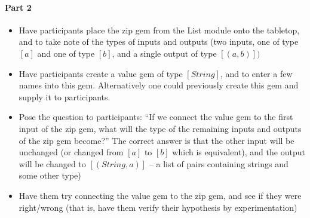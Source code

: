 {		\paragraph{Part 2}
		
		\begin{itemize}
			\item Have participants place the zip gem from the List module onto the tabletop, and to take note of the types of inputs and outputs (two inputs, one of type \([a]\) and one of type \([b]\), and a single output of type \([(a,b)])\)
			\item Have participants create a value gem of type \([String]\), and to enter a few names into this gem.  Alternatively one could previously create this gem and supply it to participants.
			\item Pose the question to participants: ``If we connect the value gem to the first input of the zip gem, what will the type of the remaining inputs and outputs of the zip gem become?''  The correct answer is that the other input will be unchanged (or changed from \([a]\) to \([b]\) which is equivalent), and the output will be changed to \([(String, a)]\) -- a list of pairs containing strings and some other type)
			\item Have them try connecting the value gem to the zip gem, and see if they were right/wrong (that is, have them verify their hypothesis by experimentation)
		\end{itemize}
	}	
	
	
